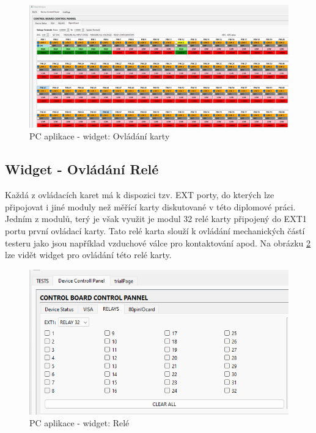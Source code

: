 \begin{figure}[ht!]
    \centering
    \includegraphics[width = 1\textwidth]{obrazky/PC_APP_CONTROL_PANEL.png}
    \caption{PC aplikace - widget: Ovládání karty}
    \label{fig: PCAPP ovladani karty}
\end{figure}

\subsection{Widget - Ovládání Relé}
Každá z ovládacích karet má k dispozici tzv. EXT porty, do kterých lze připojovat i jiné moduly než měřící karty diskutované v této diplomové práci.
Jedním z modulů, terý je však využit je modul 32 relé karty připojený do EXT1 portu první ovládací karty. Tato relé karta slouží k ovládání mechanických
částí testeru jako jsou například vzduchové válce pro kontaktování apod. Na obrázku \ref{fig: PCAPP rele} lze vidět widget pro ovládání této relé karty.

\begin{figure}[ht!]
    \centering
    \includegraphics[height = 0.25\textheight]{obrazky/PC_APP_RELAY.png}
    \caption{PC aplikace - widget:  Relé}
    \label{fig: PCAPP rele}
\end{figure}


